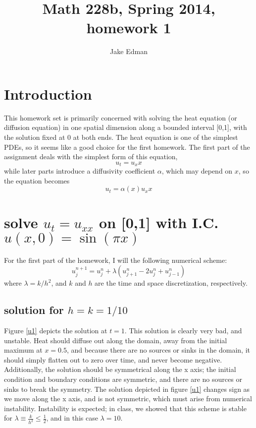 \documentclass[11pt]{amsart}
\title{Math 228b, Spring 2014, homework 1}
\author{Jake Edman}
\date{}                                           %
\begin{document}
\maketitle
\section{Introduction}
This homework set is primarily concerned with solving the heat equation (or diffusion equation) in one spatial dimension along a bounded interval [0,1], with the solution fixed at 0 at both ends. The heat equation is one of the simplest PDEs, so it seems like a good choice for the first homework. 
The first part of the assignment deals with the simplest form of this equation, 
\begin{equation} 
u_t =u_xx 
\end{equation} 
while later parts introduce a diffusivity coefficient $\alpha$, which may depend on $x$, so the equation becomes
\begin{equation} 
u_t = \alpha(x) u_xx
\end{equation} 


\section{solve $u_t = u_{xx}$ on [0,1] with I.C. $u(x,0)= \sin(\pi x)$}

For the first part of the homework, I will the following numerical scheme: 
\begin{equation} 
u_j^{n+1} = u_j^n + \lambda (u_{j+1}^n - 2u_j^n + u_{j-1}^n)
\end{equation} 
where $\lambda = k/h^2$, and $k$ and $h$ are the time and space discretization, respectively.  


\subsection{solution for $h=k=1/10$}
Figure \ref{u1} depicts the solution at $t=1$.  This solution is clearly very bad, and unstable. Heat should diffuse out along the domain, away from the initial maximum at $x=0.5$, and because there are no sources or sinks in the domain, it should simply flatten out to zero over time, and never become negative.  Additionally, the solution should be symmetrical along the x axis; the initial condition and boundary conditions are symmetric, and there are no sources or sinks to break the symmetry. The solution depicted in figure \ref{u1} changes sign as we move along the x axis, and is not symmetric, which must arise from  numerical instability. Instability is expected; in class, we showed that this scheme is stable for $\lambda \equiv \frac{k}{h^2} \le \frac{1}{2}$, and in this case $\lambda = 10$. 
\end{document}
